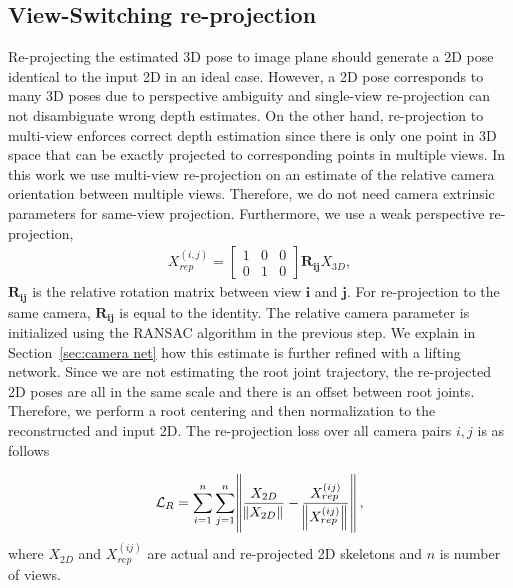 \documentclass[10pt,twocolumn,letterpaper]{article}
\begin{document}
\subsection{View-Switching re-projection}
Re-projecting the estimated 3D pose to image plane should generate a 2D pose identical to the input 2D in an ideal case. However, a 2D pose corresponds to many 3D poses due to perspective ambiguity and single-view re-projection can not disambiguate wrong depth estimates. On the other hand, re-projection to multi-view enforces correct depth estimation since there is only one point in 3D space that can be exactly projected to corresponding points in multiple views. In this work we use multi-view re-projection on an estimate of the relative camera orientation between multiple views. Therefore, we do not need camera extrinsic parameters for same-view projection. Furthermore, we use a weak perspective re-projection,
\begin{gather}
 X^{(i,j)}_{rep} =
  \begin{bmatrix}  
   1 & 0 & 0 \\
   0 & 1 & 0 
   \end{bmatrix} \mathbf{R_{ij}} X_{3D},
\label{equ:projection}
\end{gather}
$\mathbf{R_{ij}}$ is the relative rotation matrix between view  $\mathbf{i}$ and $\mathbf{j}$.
For re-projection to the same camera, $\mathbf{R_{ij}}$ is equal to the identity. The relative camera parameter is initialized using the RANSAC algorithm in the previous step. We explain in Section~\ref{sec:camera net} how this estimate  is further refined with a lifting network. Since we are not estimating the root joint trajectory, the re-projected 2D poses are all in the same scale and there is an offset between root joints. Therefore, we perform a root centering and then normalization to the reconstructed and input 2D. The re-projection loss over all camera pairs $i,j$ is as follows

\begin{align}
\mathcal{L}_{R} = \sum_{i=1}^{n}\sum_{j=1}^{n} \norm{\frac{X_{2D}}{\norm{X_{2D}}}-\frac{X^{(ij)}_{rep}}{\norm{X^{(ij)}_{rep}}}},
\label{equ:projection_loss}
\end{align}
where $X_{2D}$ and $X^{(ij)}_{rep}$ are actual and re-projected 2D skeletons and $n$ is number of views.
\end{document}
